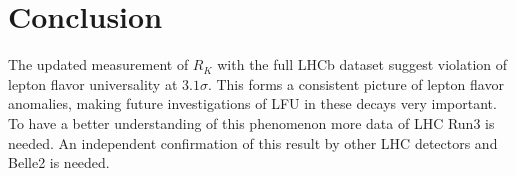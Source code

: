\section{Conclusion}
The updated measurement of $R_K$ with the full LHCb dataset 
suggest violation of lepton flavor universality at $3.1\sigma$.
This forms a consistent picture of lepton flavor anomalies,
making future investigations of LFU in these decays very important.
To have a better understanding of this phenomenon more data of 
LHC Run3 is needed.
An independent confirmation of this result by other LHC detectors and 
Belle2 is needed.

